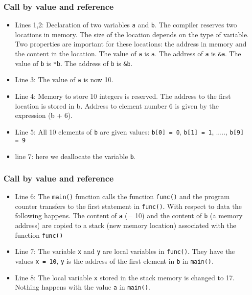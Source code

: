 \documentclass{beamer}
\begin{document}
\begin{frame}
\frametitle{Call by value and reference}

\begin{itemize}
  \item Lines 1,2: Declaration of two variables \Verb!a! and \Verb!b!. The compiler reserves two locations in memory. The size of the location depends on the type of variable. Two properties are important for these locations: the address in memory and the content in the location. The value of \Verb!a! is \Verb!a!. The address of \Verb!a! is \Verb!&a!. The value of \Verb!b! is \Verb!*b!. The address of \Verb!b! is \Verb!&b!.

  \item Line 3: The value of \Verb!a! is now 10.

  \item Line 4: Memory to store 10 integers is reserved. The address to the first location is stored in b. Address to element number 6 is given by the expression (b + 6).

  \item Line 5: All 10 elements of \Verb!b! are given values: \Verb!b[0] = 0!, \Verb!b[1] = 1!, ....., \Verb!b[9] = 9!

  \item line 7: here we deallocate the variable \Verb!b!.
\end{itemize}

\noindent
\end{frame}

\begin{frame}
\frametitle{Call by value and reference}

\begin{itemize}
  \item Line 6: The \Verb!main()! function calls the function \Verb!func()! and the program counter transfers to the first statement in \Verb!func()!. With respect to data the following happens. The content of \Verb!a! (= 10) and the content of \Verb!b! (a memory address) are copied to a stack (new memory location) associated with the function \Verb!func()!

  \item Line 7: The variable \Verb!x! and \Verb!y! are local variables in \Verb!func()!. They have the values  \Verb!x = 10!, \Verb!y! is the address of the first element in \Verb!b! in \Verb!main()!.

  \item Line 8: The local variable \Verb!x! stored in the stack memory is changed to 17. Nothing happens with the value \Verb!a! in \Verb!main()!.
\end{itemize}

\noindent
\end{frame}
\end{document}
